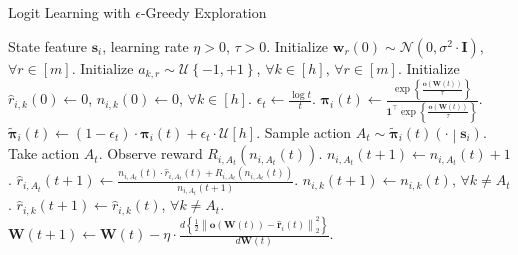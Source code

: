 \documentclass[10pt]{article}
\def\rvo{{\mathbf{o}}}
\def\rvr{{\mathbf{r}}}
\def\rvs{{\mathbf{s}}}
\def\rvw{{\mathbf{w}}}
\def\rvo{{\mathbf{o}}}
\def\rvone{{\mathbf{1}}}
\def\rvpi{{\boldsymbol{\pi}}}
\def\rmI{{\mathbf{I}}}
\def\rmW{{\mathbf{W}}}
\def\gN{{\mathcal{N}}}
\def\gU{{\mathcal{U}}}
\begin{document}
\begin{algorithm}[h]
   \caption{Logit Learning with $\epsilon$-Greedy Exploration}
\label{alg:logit_learning_eps_greedy_exploration}
\begin{algorithmic}
    State feature $\rvs_i$, learning rate $\eta > 0$, $\tau > 0$.
   \STATE Initialize $\rvw_r(0) \sim \gN\left( 0, \sigma^2 \cdot \rmI \right)$, $\forall r \in [m]$. \STATE Initialize $a_{k, r} \sim \gU\left\{-1, +1\right\}$, $\forall k \in [h]$, $\forall r \in [m]$.
   \STATE Initialize $\hat{r}_{i,k}\left(0\right) \gets 0$, $n_{i,k}\left(0\right) \gets 0$, $\forall k \in [h]$.
   \STATE $\epsilon_t \gets \frac{\log{t}}{t}$.
   \STATE $\rvpi_i\left(t\right) \gets \frac{ \exp\left\{ \frac{ \rvo\left( \rmW\left(t\right)\right) }{\tau} \right\} }{\rvone^\top \exp\left\{ \frac{ \rvo\left( \rmW\left(t\right)\right) }{\tau} \right\} } $.
   \STATE $\tilde{\rvpi}_i\left(t\right) \gets \left( 1 - \epsilon_t \right) \cdot  \rvpi_i\left(t\right) + \epsilon_t \cdot \gU{\left[ h \right]}$.
   \STATE Sample action $A_{t} \sim \tilde{\rvpi}_{i}\left(t\right)\left(\cdot \middle| \rvs_i \right)$.
   \STATE Take action $A_{t}$. Observe reward $R_{i, A_{t}}\left(n_{i, A_{t}}\left(t\right) \right)$.
   \STATE $n_{i, A_{t}}\left(t+1\right) \gets n_{i, A_{t}}\left(t\right) + 1$.
   \STATE $\hat{r}_{i,A_{t}}\left(t+1\right) \gets \frac{n_{i, A_{t}}\left(t\right) \cdot \hat{r}_{i,A_{t}}\left(t\right) + R_{i, A_{t}}\left(n_{i, A_{t}}\left(t\right)\right) }{n_{i, A_{t}}\left(t+1\right)}$.
   \STATE $n_{i, k}\left(t+1\right) \gets n_{i, k}\left(t\right)$, $\forall k \not= A_t$.
   \STATE $\hat{r}_{i,k}\left(t+1\right) \gets \hat{r}_{i,k}\left(t\right)$, $\forall k \not= A_t$.
   \STATE $\rmW(t+1) \leftarrow \rmW(t) - \eta \cdot \frac{d \left\{ \frac{1}{2} \left\| \rvo\left( \rmW\left(t\right)\right) - \hat{\rvr}_i\left(t\right) \right\|_2^2 \right\}}{d \rmW(t)}$.
   \ENDFOR
\end{algorithmic}
\end{algorithm}
\end{document}
